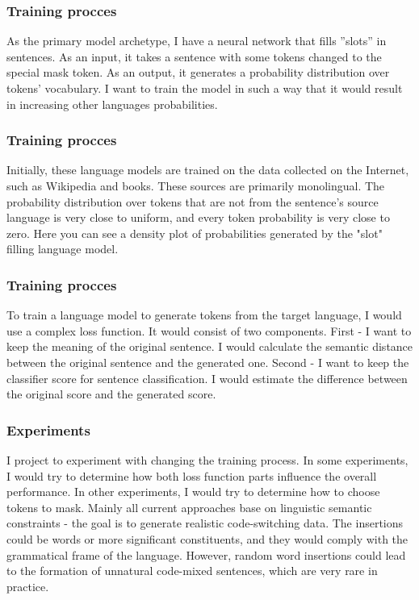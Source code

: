 \documentclass{beamer}
\begin{document}
\begin{frame}
\frametitle{Training procces}
As the primary model archetype, I have a neural network that fills ”slots” in sentences. As an input, it takes a sentence with some tokens changed to the special mask token. As an output, it generates a probability distribution over tokens’ vocabulary. I want to train the model in such a way that it would result in increasing other languages probabilities.
\end{frame}


\begin{frame}
\frametitle{Training procces}
Initially, these language models are trained on the data collected on the Internet, such as Wikipedia and books. These sources are primarily monolingual. The probability distribution over tokens that are not from the sentence's source language is very close to uniform, and every token probability is very close to zero. Here you can see a density plot of probabilities generated by the "slot" filling language model.
\end{frame}


\begin{frame}
\frametitle{Training procces}
To train a language model to generate tokens from the target language, I would use a complex loss function. It would consist of two components. First - I want to keep the meaning of the original sentence. I would calculate the semantic distance between the original sentence and the generated one. Second - I want to keep the classifier score for sentence classification. I would estimate the difference between the original score and the generated score. 
\end{frame}



\begin{frame}
\frametitle{Experiments}
I project to experiment with changing the training process. In some experiments, I would try to determine how both loss function parts influence the overall performance. In other experiments, I would try to determine how to choose tokens to mask. Mainly all current approaches base on linguistic semantic constraints - the goal is to generate realistic code-switching data. The insertions could be words or more significant constituents, and they would comply with the grammatical frame of the language. However, random word insertions could lead to the formation of unnatural code-mixed sentences, which are very rare in practice.
\end{frame}
\end{document}
